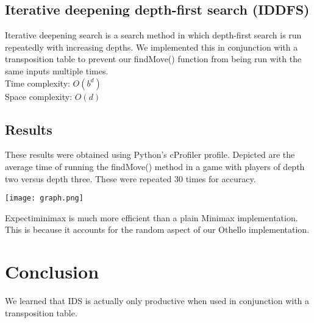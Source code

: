 \documentclass[a4paper,12pt]{article}
\begin{document}
\begin{spacing}{1.5}
\subsection{Iterative deepening depth-first search (IDDFS)}
	Iterative deepening search is a search method in which depth-first search is run repeatedly with increasing depths.  We implemented this in conjunction with a transposition table to prevent our findMove() function from being run with the same inputs multiple times.\\[\baselineskip]
Time complexity: $ O(b^d) $\\
Space complexity: $ O(d) $

	\subsection{Results}
	These results were obtained using Python's cProfiler profile.  Depicted are the average time of running the findMove() method in a game with players of depth two versus depth three.  These were repeated 30 times for accuracy.
\begin{center}
	\texttt{[image: graph.png]}
\end{center}
Expectiminimax is much more efficient than a plain Minimax implementation.  This is because it accounts for the random aspect of our Othello implementation.
\section{Conclusion}
We learned that IDS is actually only productive when used in conjunction with a transposition table.
\end{spacing}
\end{document}

